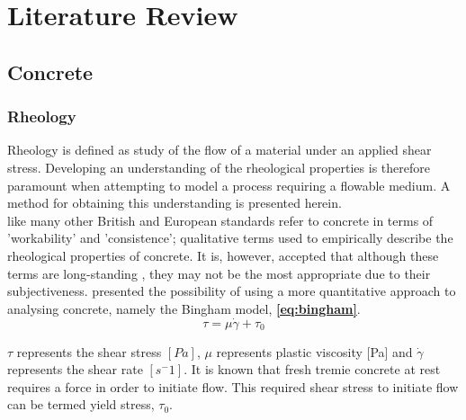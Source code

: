 
\chapter{Literature Review}

\ifpdf
    \graphicspath{{Chapter2/Figs/Raster/}{Chapter2/Figs/PDF/}{Chapter2/Figs/}}
\else
    \graphicspath{{Chapter2/Figs/Vector/}{Chapter2/Figs/}}
\fi


\section{Concrete}
\subsection{Rheology}

Rheology is defined as study of the flow of a material under an applied shear stress. Developing an understanding of the rheological properties is therefore paramount when attempting to model a process requiring a flowable medium. A method for obtaining this understanding is presented herein.\\
\newline
\noindent
\citet{Sperwall} like many other British and European standards refer to concrete in terms of 'workability' and 'consistence'; qualitative terms used to empirically describe the rheological properties of concrete. It is, however, accepted that although these terms are long-standing \citep{Tattersall83}, they may not be the most appropriate due to their subjectiveness. \citet{Tattersall90} presented the possibility of using a more quantitative approach to analysing concrete, namely the Bingham model, {\bfseries \ref{eq:bingham}}.
\begin{equation}
\tau = \mu\dot{\gamma}+\tau_0
\label{eq:bingham}
\end{equation}

\noindent
$\tau$ represents the shear stress $[Pa]$, $\mu$ represents plastic viscosity [Pa] and $\dot{\gamma}$ represents the shear rate $[s^-1]$. It is known that fresh tremie concrete at rest requires a force in order to initiate flow. This required shear stress to initiate flow can be termed yield stress, $\tau_0$. 
\\
\\
\\

